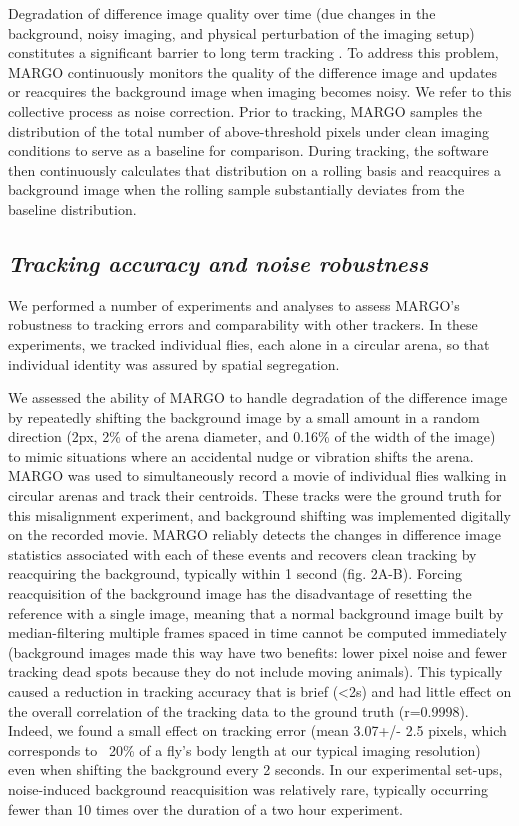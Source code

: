 \documentclass[10pt]{article}
\begin{document}
\begin{multicols}{2}
Degradation of difference image quality over time (due changes in the background, noisy imaging, and physical perturbation of the imaging setup) constitutes a significant barrier to long term tracking \citep{Sridhar_2019}. To address this problem, MARGO continuously monitors the quality of the difference image and updates or reacquires the background image when imaging becomes noisy. We refer to this collective process as noise correction. Prior to tracking, MARGO samples the distribution of the total number of above-threshold pixels under clean imaging conditions to serve as a baseline for comparison. During tracking, the software then continuously calculates that distribution on a rolling basis and reacquires a background image when the rolling sample substantially deviates from the baseline distribution.

\subsection*{\textit{Tracking accuracy and noise robustness}}

We performed a number of experiments and analyses to assess MARGO's robustness to tracking errors and comparability with other trackers. In these experiments, we tracked individual flies, each alone in a circular arena, so that individual identity was assured by spatial segregation.

We assessed the ability of MARGO to handle degradation of the difference image by repeatedly shifting the background image by a small amount in a random direction (2px, 2\% of the arena diameter, and 0.16\% of the width of the image) to mimic situations where an accidental nudge or vibration shifts the arena. MARGO was used to simultaneously record a movie of individual flies walking in circular arenas and track their centroids. These tracks were the ground truth for this misalignment experiment, and background shifting was implemented digitally on the recorded movie. MARGO reliably detects the changes in difference image statistics associated with each of these events and recovers clean tracking by reacquiring the background, typically within 1 second (fig. 2A-B). Forcing reacquisition of the background image has the disadvantage of resetting the reference with a single image, meaning that a normal background image built by median-filtering multiple frames spaced in time cannot be computed immediately (background images made this way have two benefits: lower pixel noise and fewer tracking dead spots because they do not include moving animals). This typically caused a reduction in tracking accuracy that is brief (<2s) and had little effect on the overall correlation of the tracking data to the ground truth (r=0.9998). Indeed, we found a small effect on tracking error (mean 3.07+/- 2.5 pixels, which corresponds to ~20\% of a fly's body length at our typical imaging resolution) even when shifting the background every 2 seconds. In our experimental set-ups, noise-induced background reacquisition was relatively rare, typically occurring fewer than 10 times over the duration of a two hour experiment.


\end{multicols}
\end{document}
